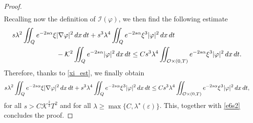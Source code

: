 \documentclass{amsart}    %
\newcommand{\intd}{\displaystyle\int \kern -7pt \int}
\begin{document}
\begin{proof}
\begin{align*}
\end{align*}
Recalling now the definition of $\mathcal{I}(\varphi)$, we then find the following estimate
\begin{align*}
	s\lambda^2\intd_Q e^{-2s\alpha}\xi & |\nabla \varphi|^2\,dx\,dt + s^3\lambda^4\intd_Q e^{-2s\alpha}\xi^3|\varphi|^2\,dx\,dt 
	\\
	&- \mathcal{K}^2\intd_Q e^{-2s\alpha}|\varphi|^2\,dx\,dt \leq C s^3\lambda^4\intd_{\mathcal O\times(0,T)} e^{-2s\alpha}\xi^3 |\varphi|^2\,dx\,dt.
\end{align*}
Therefore, thanks to \eqref{xi_est}, we finally obtain
\begin{align*}
	s\lambda^2\intd_Q e^{-2s\alpha}\xi |\nabla \varphi|^2\,dx\,dt + s^3\lambda^4\intd_Q e^{-2s\alpha}\xi^3|\varphi|^2\,dx\,dt \leq C s^3\lambda^4\intd_{\mathcal O\times(0,T)} e^{-2s\alpha}\xi^3 |\varphi|^2\,dx\,dt,
\end{align*}
for all $s>C\mathcal{K}^{\frac 23}T^2$ and for all $\lambda\geq\max\{C,\lambda^\star(\varepsilon)\}$. This, together with \eqref{e6s2} concludes the proof.
\end{proof}
\end{document}
